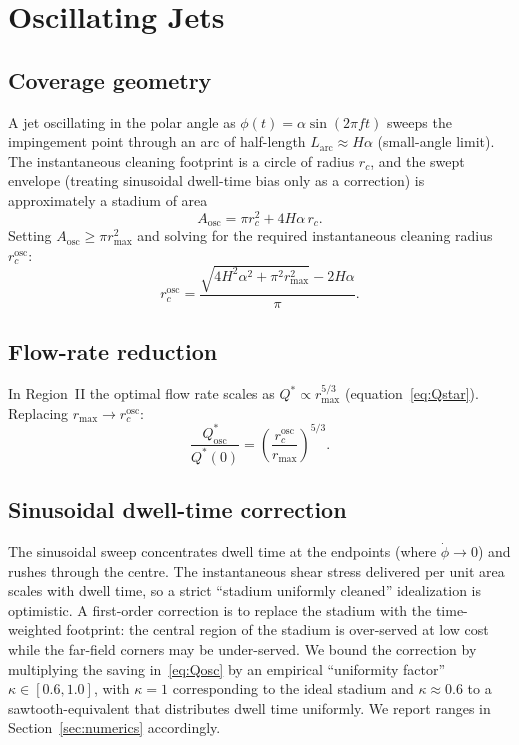 \documentclass[aps,prfluids,reprint,amsmath,amssymb,floatfix]{revtex4-2}
\begin{document}
\section{Oscillating Jets}
\label{sec:oscillating}

\subsection{Coverage geometry}

A jet oscillating in the polar angle as $\phi(t) = \alpha\sin(2\pi f t)$
sweeps the impingement point through an arc of half-length $L_\mathrm{arc}
\approx H\alpha$ (small-angle limit). The instantaneous cleaning footprint
is a circle of radius $r_c$, and the swept envelope (treating sinusoidal
dwell-time bias only as a correction) is approximately a stadium of area
\begin{equation}
  A_\mathrm{osc} = \pi r_c^2 + 4 H \alpha\,r_c.
  \label{eq:Aosc}
\end{equation}
Setting $A_\mathrm{osc} \geq \pi r_\mathrm{max}^2$ and solving for the
required instantaneous cleaning radius $r_c^\mathrm{osc}$:
\begin{equation}
  r_c^\mathrm{osc} =
  \frac{\sqrt{4 H^2 \alpha^2 + \pi^2 r_\mathrm{max}^2} - 2 H\alpha}{\pi}.
  \label{eq:rcosc}
\end{equation}

\subsection{Flow-rate reduction}

In Region~II the optimal flow rate scales as $Q^* \propto r_\mathrm{max}^{5/3}$
(equation~\eqref{eq:Qstar}). Replacing $r_\mathrm{max} \to r_c^\mathrm{osc}$:
\begin{equation}
  \frac{Q^*_\mathrm{osc}}{Q^*(0)} = \left(\frac{r_c^\mathrm{osc}}{r_\mathrm{max}}\right)^{5/3}.
  \label{eq:Qosc}
\end{equation}

\subsection{Sinusoidal dwell-time correction}

The sinusoidal sweep concentrates dwell time at the endpoints (where
$\dot\phi \to 0$) and rushes through the centre. The instantaneous
shear stress delivered per unit area scales with dwell time, so a strict
``stadium uniformly cleaned'' idealization is optimistic. A first-order
correction is to replace the stadium with the time-weighted footprint:
the central region of the stadium is over-served at low cost while the
far-field corners may be under-served. We bound the correction by
multiplying the saving in~\eqref{eq:Qosc} by an empirical
``uniformity factor'' $\kappa \in [0.6, 1.0]$, with $\kappa = 1$
corresponding to the ideal stadium and $\kappa \approx 0.6$ to a
sawtooth-equivalent that distributes dwell time uniformly. We report
ranges in Section~\ref{sec:numerics} accordingly.
\end{document}

